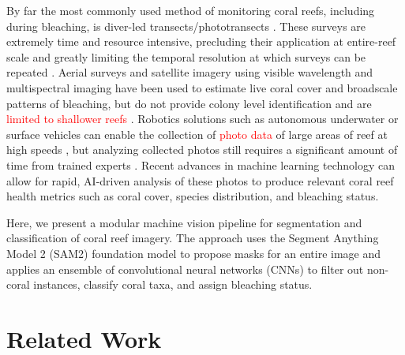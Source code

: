 \documentclass[11pt]{elsarticle}
\newcommand{\revadd}[1]{\textcolor{red}{#1}}
\newcommand{\revdel}[1]{%
  \sbox\revdelbox{#1}%
  \makebox[0pt][l]{\raisebox{0.45ex}{\rule{\wd\revdelbox}{0.4pt}}}\usebox\revdelbox
}
\begin{document}
By far the most commonly used method of monitoring coral reefs, including during bleaching, is diver-led transects/phototransects \citep{rivera2025}. These surveys are extremely time and resource intensive, precluding their application at entire-reef scale and greatly limiting the temporal resolution at which surveys can be repeated \citep{cresswell2021,mcdonald2010}. Aerial surveys and satellite imagery using visible wavelength and multispectral imaging have been used to estimate live coral cover and broadscale patterns of bleaching, but do not provide colony level identification and are \revdel{limited shallower reefs}\revadd{limited to shallower reefs} \citep{asner2022,ayad2025}. Robotics solutions such as autonomous underwater or surface vehicles can enable the collection of \revdel{photodata}\revadd{photo data} of large areas of reef at high speeds \citep{raber2019}, but analyzing collected photos still requires a significant amount of time from trained experts \citep{josephitis2012}. Recent advances in machine learning technology can allow for rapid, AI-driven analysis of these photos to produce relevant coral reef health metrics such as coral cover, species distribution, and bleaching status.

Here, we present a modular machine vision pipeline for segmentation and classification of coral reef imagery. The approach uses the Segment Anything Model 2 (SAM2) \revadd{\citep{ravi2024sam2}} foundation model to propose masks for an entire image and applies an ensemble of convolutional neural networks (CNNs) to filter out non-coral instances, classify coral taxa, and assign bleaching status.


\section{Related Work}
\end{document}
